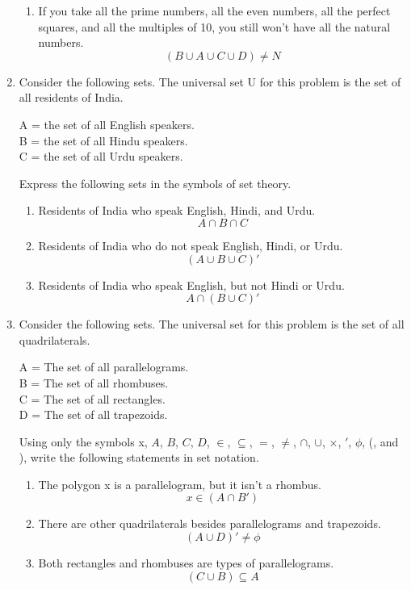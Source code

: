 \documentclass[12pt]{article}
\begin{document}
\begin{enumerate}
\begin{enumerate}
    \item If you take all the prime numbers, all the even numbers, all the perfect squares, and all the multiples of 10, you still won’t have all the natural numbers.
      \[(B \cup A \cup C \cup D) \neq N\]
  \end{enumerate}
  \item Consider the following sets. The universal set U for this problem is the set of all residents of India.
  \begin{center}
    A = the set of all English speakers.\\
    B = the set of all Hindu speakers.\\
    C = the set of all Urdu speakers.\\
  \end{center}
  Express the following sets in the symbols of set theory.
  \begin{enumerate}
    \item Residents of India who speak English, Hindi, and Urdu.
      \[A \cap B \cap C\]
    \item Residents of India who do not speak English, Hindi, or Urdu.
      \[(A \cup B \cup C)'\]
    \item Residents of India who speak English, but not Hindi or Urdu.
      \[A \cap (B \cup C)'\]
  \end{enumerate}

  \newpage 
  \item Consider the following sets. The universal set for this problem is the set of all quadrilaterals.
  \begin{center}
    A = The set of all parallelograms.\\
    B = The set of all rhombuses.\\
    C = The set of all rectangles.\\
    D = The set of all trapezoids.\\
  \end{center}
  Using only the symbols x, $A$, $B$, $C$, $D$, $\in$, $\subseteq$, $=$, $\neq$, $\cap$, $\cup$, $\times$, $'$, $\phi$, (, and ), write the following statements in set notation.
  \begin{enumerate}
    \item The polygon x is a parallelogram, but it isn’t a rhombus.
      \[x \in (A \cap B')\]
    \item There are other quadrilaterals besides parallelograms and trapezoids.
      \[(A \cup D)' \neq \phi\]
    \item Both rectangles and rhombuses are types of parallelograms.
      \[(C \cup B) \subseteq A\]
  \end{enumerate}
  

\end{enumerate}
\end{document}
